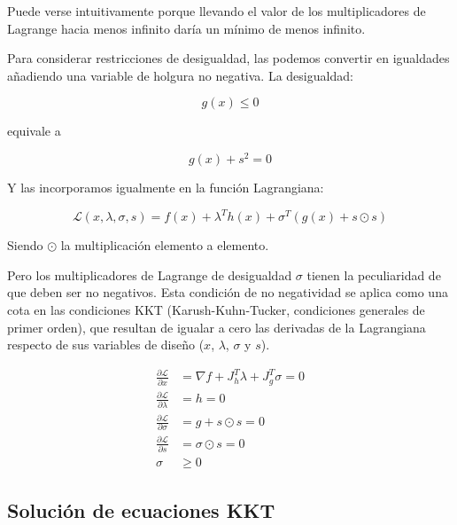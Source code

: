 Puede verse intuitivamente porque llevando el valor de los multiplicadores de
Lagrange hacia menos infinito daría un mínimo de menos infinito.

Para considerar restricciones de desigualdad, las podemos convertir en
igualdades añadiendo una variable de holgura no negativa. La desigualdad:

\begin{equation}
	g(x) \leq 0
\end{equation}

equivale a

\begin{equation}
	g(x) + s^2 = 0
\end{equation}

Y las incorporamos igualmente en la función Lagrangiana:

\begin{equation}
	\mathcal{L}(x, \lambda, \sigma, s) = f(x) + \lambda^T h(x) + \sigma^T (g(x) + s \odot s)
\end{equation}

Siendo $\odot$ la multiplicación elemento a elemento.


Pero los multiplicadores de Lagrange de desigualdad $\sigma$ tienen la
peculiaridad de que deben ser no negativos. Esta condición de no negatividad se
aplica como una cota en las condiciones KKT (Karush-Kuhn-Tucker, condiciones
generales de primer orden), que resultan de igualar a cero las derivadas de la
Lagrangiana respecto de sus variables de diseño ($x$, $\lambda$, $\sigma$ y
$s$).

\begin{align}
	\frac{\partial \mathcal{L}}{\partial x}       & = \nabla f + J_h^T \lambda + J_g^T \sigma = 0             \\
	\frac{\partial \mathcal{L}}{\partial \lambda} & = h = 0                                                   \\
	\frac{\partial \mathcal{L}}{\partial \sigma}  & = g + s \odot s = 0                                       \\
	\frac{\partial \mathcal{L}}{\partial s}       & = \sigma \odot s = 0   \label{eq:complementary_slackness} \\
	\sigma                                        & \geq 0
\end{align}

\subsection{Solución de ecuaciones KKT}

